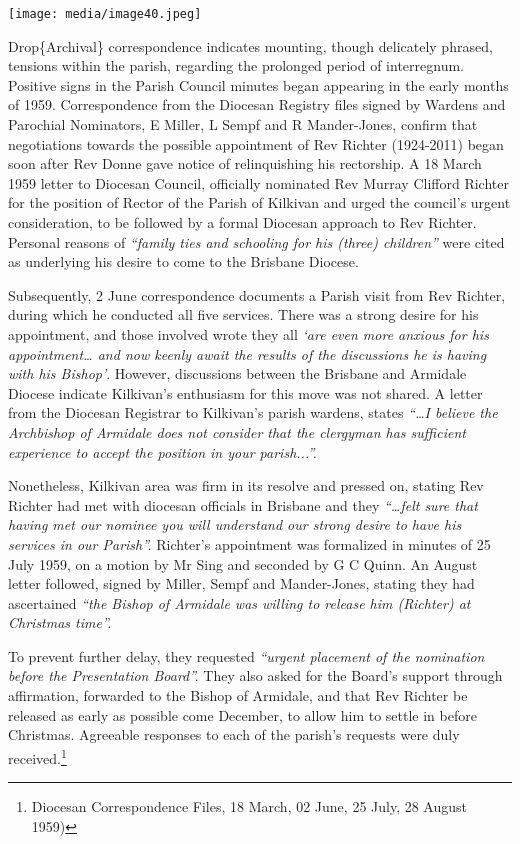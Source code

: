 \texttt{[image: media/image40.jpeg]}

Drop\{Archival\} correspondence indicates mounting, though delicately phrased, tensions within the parish, regarding the prolonged period of interregnum. Positive signs in the Parish Council minutes began appearing in the early months of 1959. Correspondence from the Diocesan Registry files signed by Wardens and Parochial Nominators, E Miller, L Sempf and R Mander-Jones, confirm that negotiations towards the possible appointment of Rev Richter (1924-2011) began soon after Rev Donne gave notice of relinquishing his rectorship. A 18 March 1959 letter to Diocesan Council, officially nominated Rev Murray Clifford Richter for the position of Rector of the Parish of Kilkivan and urged the council's urgent consideration, to be followed by a formal Diocesan approach to Rev Richter. Personal reasons of \emph{``family ties and schooling for his (three) children''} were cited as underlying his desire to come to the Brisbane Diocese.

Subsequently, 2 June correspondence documents a Parish visit from Rev Richter, during which he conducted all five services. There was a strong desire for his appointment, and those involved wrote they all \emph{`are even more anxious for his appointment\ldots{} and now keenly await the results of the discussions he is having with his Bishop'}. However, discussions between the Brisbane and Armidale Diocese indicate Kilkivan's enthusiasm for this move was not shared. A letter from the Diocesan Registrar to Kilkivan's parish wardens, states \emph{``\ldots I believe the Archbishop of Armidale does not consider that the clergyman has sufficient experience to accept the position in your parish...''.}

Nonetheless, Kilkivan area was firm in its resolve and pressed on, stating Rev Richter had met with diocesan officials in Brisbane and they \emph{``\ldots felt sure that having met our nominee you will understand our strong desire to have his services in our Parish''.} Richter's appointment was formalized in minutes of 25 July 1959, on a motion by Mr Sing and seconded by G C Quinn. An August letter followed, signed by Miller, Sempf and Mander-Jones, stating they had ascertained \emph{``the Bishop of Armidale was willing to release him (Richter) at Christmas time''.}

To prevent further delay, they requested \emph{``urgent placement of the nomination before the Presentation Board''.} They also asked for the Board's support through affirmation, forwarded to the Bishop of Armidale, and that Rev Richter be released as early as possible come December, to allow him to settle in before Christmas. Agreeable responses to each of the parish's requests were duly received.\footnote{Diocesan Correspondence Files, 18 March, 02 June, 25 July, 28 August 1959)}

